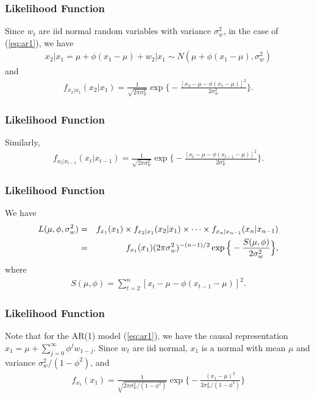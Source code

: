 \documentclass[%
xcolor=pdftex]{beamer}
\begin{document}
\begin{frame}
\frametitle{Likelihood Function}

Since $w_t$ are iid normal random variables with variance
$\sigma^2_w$, in the case of (\ref{eq:ar1}), we have
\begin{eqnarray*}
x_2|x_1 =\mu+\phi(x_1-\mu) + w_2|x_1 \sim N(\mu+\phi(x_1-\mu),\sigma^2_w)
\end{eqnarray*}
and
\begin{eqnarray*}
 f_{x_2|x_1}(x_2|x_1) = \frac{1}{\sqrt{2\pi \sigma_w^2}}
\exp \Big \{-\frac{[x_2-\mu-\phi(x_1-\mu)]^2}{2\sigma^2 _w} \Big \}.
\end{eqnarray*}


\end{frame}

\begin{frame}
\frametitle{Likelihood Function}

Similarly,
\begin{eqnarray*}
f_{x_t|x_{t-1}}(x_t|x_{t-1}) = \frac{1}{\sqrt{2\pi \sigma_w^2}}
\exp \Big \{-\frac{[x_t-\mu-\phi(x_{t-1}-\mu)]^2}{2\sigma^2 _w} \Big \}.
\end{eqnarray*}

\end{frame}

\begin{frame}
\frametitle{Likelihood Function}

We have
\begin{eqnarray}\label{eq:cle}
L(\mu,\phi,\sigma^2_w) &=& f_{x_1}(x_1) \times f_{x_2|x_1}(x_2|x_1) \times \cdots \times f_{x_n|x_{n-1}}(x_n|x_{n-1}) \cr
&=& f_{x_1}(x_1) (2\pi \sigma^2_w)^{-(n-1)/2} \exp \Big \{ -\frac{S(\mu,\phi)}{2\sigma^2_w} \Big \},
\end{eqnarray}
where
\begin{eqnarray*}
S(\mu,\phi) = \sum^n_{t=2} [x_t-\mu-\phi(x_{t-1}-\mu)]^2.
\end{eqnarray*}

\end{frame}


\begin{frame}
\frametitle{Likelihood Function}

Note that for the AR(1) model (\ref{eq:ar1}), we have the
causal representation $x_1=\mu+\sum^\infty_{j=0} \phi^j
w_{1-j}$. Since $w_t$ are iid normal, $x_1$ is a normal with
mean $\mu$ and variance $\sigma^2_w/(1-\phi^2)$, and
\begin{eqnarray*}
f_{x_1}(x_1)=\frac{1}{\sqrt{2\pi \sigma^2_w/(1-\phi^2)}}
\exp \Big \{- \frac{(x_1-\mu)^2}{2\sigma^2_w/(1-\phi^2)} \Big \}
\end{eqnarray*}

\end{frame}
\end{document}
